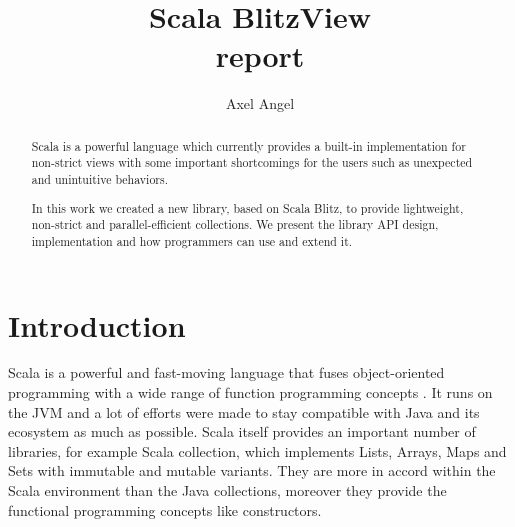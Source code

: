 \documentclass[a4paper,12pt,twocolumn]{article}
\title{Scala BlitzView\\report}
\author{Axel Angel}
\begin{document}
\maketitle

\begin{abstract}
Scala is a powerful language which currently provides a built-in implementation for non-strict views with some important shortcomings for the users such as unexpected and unintuitive behaviors.

In this work we created a new library, based on Scala Blitz, to provide lightweight, non-strict and parallel-efficient collections.
We present the library API design, implementation and how programmers can use and extend it.
\end{abstract}

\section{Introduction}
Scala is a powerful and fast-moving language that fuses object-oriented programming with a wide range of function programming concepts \cite{scala-overview}.
It runs on the JVM and a lot of efforts were made to stay compatible with Java and its ecosystem as much as possible.
Scala itself provides an important number of libraries, for example Scala collection, which implements Lists, Arrays, Maps and Sets with immutable and mutable variants.
They are more in accord within the Scala environment than the Java collections, moreover they provide the functional programming concepts like constructors.
\end{document}

